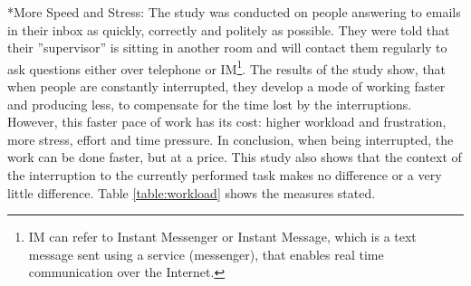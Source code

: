 \documentclass[11pt,singleside]{myfithesis2}
\makeatletter
\renewcommand\paragraph{
   \vspace{-10pt}
   \@startsection{paragraph}{4}{0mm}
      {\baselineskip}
      {- 5pt}
      {\normalfont\normalsize\bfseries}
}
\makeatother
\begin{document}
\paragraph*{More Speed and Stress: } The study \cite{studySpeedAndStress} was conducted on people answering to emails in their inbox as quickly, correctly and politely as possible. They were told that their ''supervisor'' is sitting in another room and will contact them regularly to ask questions either over telephone or IM\footnote{IM can refer to Instant Messenger or Instant Message, which is a text message sent using a service (messenger), that enables real time communication over the Internet.}. The results of the study show, that when people are constantly interrupted, they develop a mode of working faster and producing less, to compensate for the time lost by the interruptions. However, this faster pace of work has its cost: higher workload and frustration, more stress, effort and time pressure. In conclusion, when being interrupted, the work can be done faster, but at a price. This study also shows that the context of the interruption to the currently performed task makes no difference or a very little difference. Table \ref{table:workload} shows the measures stated.
\begin{table}[h]
\centering
{}
\caption{Mean workload measures across interruption types. Scale is 1(low)-20(high).}
\label{table:workload}
\end{table}
\end{document}
